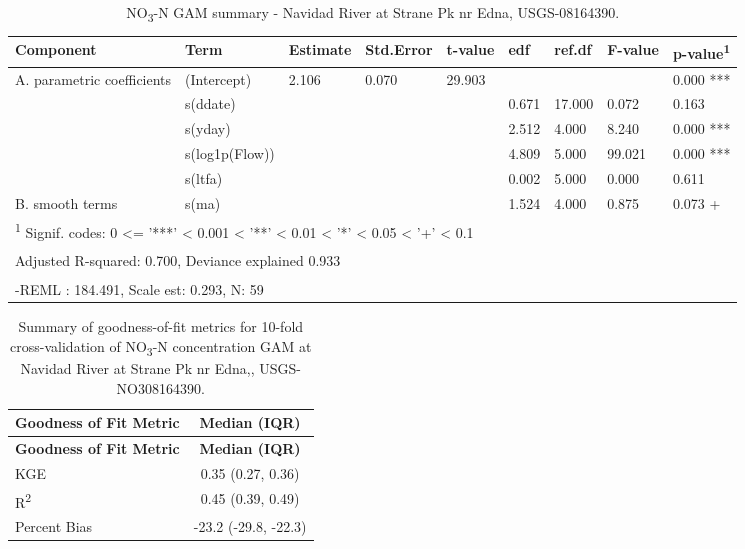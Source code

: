 \documentclass[
]{article}
\newenvironment{widestuff}{\begin{table}[h]\begin{adjustwidth}{-4.5cm}{-4.5cm}\centering}{\end{adjustwidth}\end{table}}
\begin{document}
\begin{widestuff}

\caption{NO\textsubscript{3}-N GAM summary - Navidad River at Strane Pk nr Edna, USGS-08164390.}
\centering
\begin{tabular}[t]{lllllllll}
\toprule
Component & Term & Estimate & Std.Error & t-value & edf & ref.df & F-value & p-value\textsuperscript{1}\\
\midrule
A. parametric coefficients & (Intercept) & 2.106 & 0.070 & 29.903 &  &  &  & 0.000 ***\\
\cmidrule{1-9}
 & s(ddate) &  &  &  & 0.671 & 17.000 & 0.072 & 0.163\\

 & s(yday) &  &  &  & 2.512 & 4.000 & 8.240 & 0.000 ***\\

 & s(log1p(Flow)) &  &  &  & 4.809 & 5.000 & 99.021 & 0.000 ***\\

 & s(ltfa) &  &  &  & 0.002 & 5.000 & 0.000 & 0.611\\

\multirow[t]{-5}{*}{\raggedright\arraybackslash B. smooth terms} & s(ma) &  &  &  & 1.524 & 4.000 & 0.875 & 0.073 +\\
\bottomrule
\multicolumn{9}{l}{\textsuperscript{1} Signif. codes: 0 <= '***' < 0.001 < '**' < 0.01 < '*' < 0.05 < '+' < 0.1}\\
\multicolumn{9}{l}{\textsuperscript{} Adjusted R-squared: 0.700, Deviance explained 0.933}\\
\multicolumn{9}{l}{\textsuperscript{} -REML : 184.491, Scale est: 0.293, N: 59}\\
\end{tabular}
\end{widestuff}

\hypertarget{tbl-NO308164390-CV}{}
\begin{longtable}[]{@{}lc@{}}
\caption{\label{tbl-NO308164390-CV}Summary of goodness-of-fit metrics
for 10-fold cross-validation of NO\textsubscript{3}-N concentration GAM
at Navidad River at Strane Pk nr Edna,,
USGS-NO308164390.}\tabularnewline
\toprule()
\textbf{Goodness of Fit Metric} & \textbf{Median (IQR)} \\
\midrule()
\endfirsthead
\toprule()
\textbf{Goodness of Fit Metric} & \textbf{Median (IQR)} \\
\midrule()
\endhead
KGE & 0.35 (0.27, 0.36) \\
R\textsuperscript{2} & 0.45 (0.39, 0.49) \\
Percent Bias & -23.2 (-29.8, -22.3) \\
\bottomrule()
\end{longtable}
\end{document}

